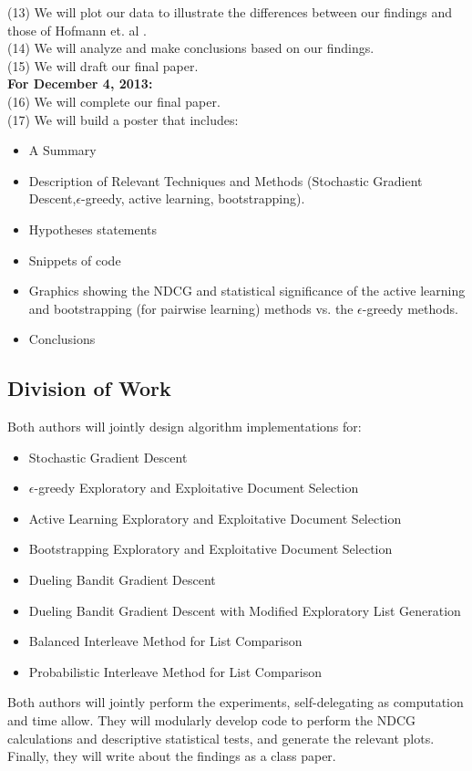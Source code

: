 \documentclass{acm_proc_article-sp}
\begin{document}
(13) We will plot our data to illustrate the differences between our findings and those of Hofmann et. al \cite{hofmann}.\\
(14) We will analyze and make conclusions based on our findings.\\
(15) We will draft our final paper.\\
{\bf For December 4, 2013:}\\
(16) We will complete our final paper.\\
(17) We will build a poster that includes:
\begin{itemize}
\item A Summary
\item Description of Relevant Techniques and Methods (Stochastic Gradient Descent,$\epsilon$-greedy, active learning, bootstrapping).
\item Hypotheses statements
\item Snippets of code
\item Graphics showing the NDCG and statistical significance of the active learning and bootstrapping (for pairwise learning) methods vs. the $\epsilon$-greedy methods.
\item Conclusions
\end{itemize}
\subsection{Division of Work}
Both authors will jointly design algorithm implementations for:
\begin{itemize}
\item Stochastic Gradient Descent
\item $\epsilon$-greedy Exploratory and Exploitative Document Selection
\item Active Learning Exploratory and Exploitative Document Selection
\item Bootstrapping Exploratory and Exploitative Document Selection
\item Dueling Bandit Gradient Descent
\item Dueling Bandit Gradient Descent with Modified Exploratory List Generation
\item Balanced Interleave Method for List Comparison
\item Probabilistic Interleave Method for List Comparison
\end{itemize}
Both authors will jointly perform the experiments, self-delegating as computation and time allow. They will modularly develop code to perform the NDCG calculations and descriptive statistical tests, and generate the relevant plots. Finally, they will write about the findings as a class paper.


\balancecolumns
\end{document}
